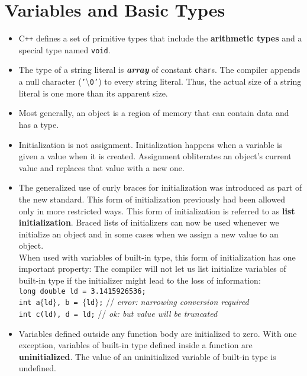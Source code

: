 \section{Variables and Basic Types}
\begin{itemize}

\item
C\texttt{++} defines a set of primitive types that include the \textbf{arithmetic types} and a special type named \texttt{void}.

\item
The type of a string literal is \textbf{\textit{array}} of constant \texttt{char}s. The compiler appends a null character (\texttt{'}\textbackslash\texttt{0'}) to every string literal. Thus, the actual size of a string literal is one more than its apparent size.

\item
Most generally, an object is a region of memory that can contain data and has a type.

\item
Initialization is not assignment. Initialization happens when a variable is given a value when it is created. Assignment obliterates an object's current value and replaces that value with a new one.

\item
The generalized use of curly braces for initialization was introduced as part of the new standard. This form of initialization previously had been allowed only in more restricted ways. This form of initialization is referred to as \textbf{list initialization}. Braced lists of initializers can now be used whenever we initialize an object and in some cases when we assign a new value to an object.\\
When used with variables of built-in type, this form of initialization has one important property: The compiler will not let us list initialize variables of built-in type if the initializer might lead to the loss of information:\\
\hspace*{1em}\texttt{long double ld = 3.1415926536;}\\
\hspace*{1em}\texttt{int a$\{$ld$\}$, b = $\{$ld$\}$;} // \textit{error: narrowing conversion required}\\\hspace*{1em}\texttt{int c(ld), d = ld;} // \textit{ok: but value will be truncated}

\item
Variables defined outside any function body are initialized to zero. With one exception, variables of built-in type defined inside a function are \textbf{uninitialized}. The value of an uninitialized variable of built-in type is undefined.


\end{itemize}

